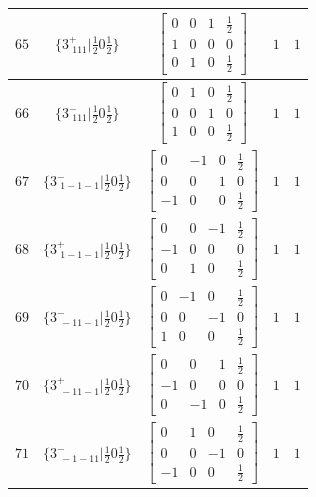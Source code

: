 \documentclass[fleqn,8pt]{jsarticle}
\begin{document}
\begin{longtable}{ccccc}
$ 65 $ & $ \{3^{+}_{\,\,111}|\frac{1}{2} 0 \frac{1}{2}\} $ & $ \begin{bmatrix} 0 & 0 & 1 & \frac{1}{2} \\ 1 & 0 & 0 & 0 \\ 0 & 1 & 0 & \frac{1}{2} \end{bmatrix} $ & $ 1 $ & $ 1 $ \\ \hline
$ 66 $ & $ \{3^{-}_{\,\,111}|\frac{1}{2} 0 \frac{1}{2}\} $ & $ \begin{bmatrix} 0 & 1 & 0 & \frac{1}{2} \\ 0 & 0 & 1 & 0 \\ 1 & 0 & 0 & \frac{1}{2} \end{bmatrix} $ & $ 1 $ & $ 1 $ \\ \hline
$ 67 $ & $ \{3^{-}_{\,\,1-1-1}|\frac{1}{2} 0 \frac{1}{2}\} $ & $ \begin{bmatrix} 0 & -1 & 0 & \frac{1}{2} \\ 0 & 0 & 1 & 0 \\ -1 & 0 & 0 & \frac{1}{2} \end{bmatrix} $ & $ 1 $ & $ 1 $ \\ \hline
$ 68 $ & $ \{3^{+}_{\,\,1-1-1}|\frac{1}{2} 0 \frac{1}{2}\} $ & $ \begin{bmatrix} 0 & 0 & -1 & \frac{1}{2} \\ -1 & 0 & 0 & 0 \\ 0 & 1 & 0 & \frac{1}{2} \end{bmatrix} $ & $ 1 $ & $ 1 $ \\ \hline
$ 69 $ & $ \{3^{-}_{\,\,-11-1}|\frac{1}{2} 0 \frac{1}{2}\} $ & $ \begin{bmatrix} 0 & -1 & 0 & \frac{1}{2} \\ 0 & 0 & -1 & 0 \\ 1 & 0 & 0 & \frac{1}{2} \end{bmatrix} $ & $ 1 $ & $ 1 $ \\ \hline
$ 70 $ & $ \{3^{+}_{\,\,-11-1}|\frac{1}{2} 0 \frac{1}{2}\} $ & $ \begin{bmatrix} 0 & 0 & 1 & \frac{1}{2} \\ -1 & 0 & 0 & 0 \\ 0 & -1 & 0 & \frac{1}{2} \end{bmatrix} $ & $ 1 $ & $ 1 $ \\ \hline
$ 71 $ & $ \{3^{-}_{\,\,-1-11}|\frac{1}{2} 0 \frac{1}{2}\} $ & $ \begin{bmatrix} 0 & 1 & 0 & \frac{1}{2} \\ 0 & 0 & -1 & 0 \\ -1 & 0 & 0 & \frac{1}{2} \end{bmatrix} $ & $ 1 $ & $ 1 $ \\ \hline

\end{longtable}
\end{document}
